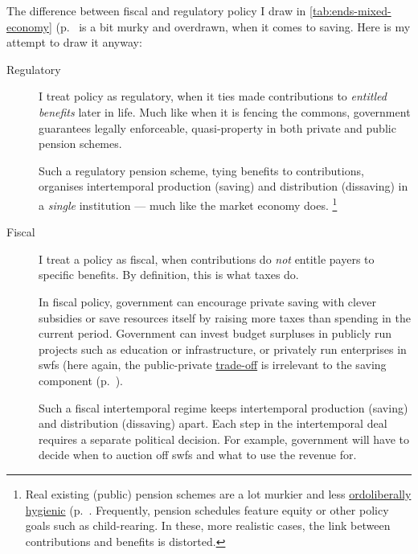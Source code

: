 The difference between fiscal and regulatory policy I draw in \autoref{tab:ends-mixed-economy} (p.~\pageref{tab:ends-mixed-economy} is a bit murky and overdrawn, when it comes to saving.
 Here is my attempt to draw it anyway:
\begin{description}
	\item[Regulatory] I treat policy as regulatory, when it ties made contributions to \emph{entitled benefits} later in life.
	Much like when it is fencing the commons, government guarantees legally enforceable, quasi-property in both private and public pension schemes.

	Such a regulatory pension scheme, tying benefits to contributions, organises intertemporal production (saving) and distribution (dissaving) in a \emph{single} institution --- much like the market economy does.
	\footnote{
		Real existing (public) pension schemes are a lot murkier and less \hyperref[sec:ordoliberal-hygiene]{ordoliberally hygienic} (p.~\pageref{sec:ordoliberal-hygiene}.
		Frequently, pension schedules feature equity or other policy goals such as child-rearing.
		In these, more realistic cases, the link between contributions and benefits is distorted.
	}

	\item[Fiscal] I treat a policy as fiscal, when contributions do \emph{not} entitle payers to specific benefits.
	By definition, this is what taxes do.

	In fiscal policy, government can encourage private saving with clever subsidies or save resources itself by raising more taxes than spending in the current period.
	Government can invest budget surpluses in publicly run projects such as education or infrastructure, or privately run enterprises in \glspl{swf} (here again, the public-private \hyperref[sec:trade-offs]{trade-off} is irrelevant to the saving component (p.~\pageref{trade-offs}).

	Such a fiscal intertemporal regime keeps intertemporal production (saving) and distribution (dissaving) apart.
	Each step in the intertemporal deal requires a separate political decision.
	For example, government will have to decide when to auction off \glspl{swf} and what to use the revenue for.
\end{description}

